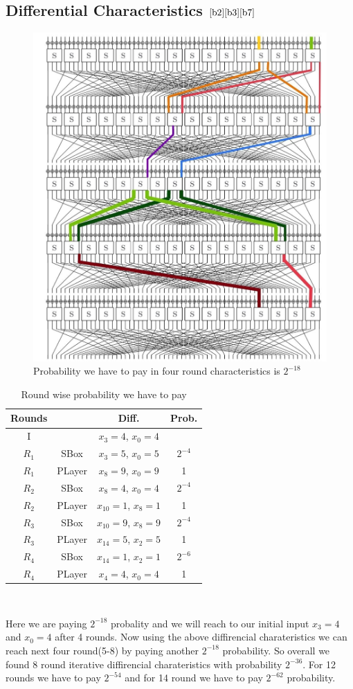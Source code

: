 \documentclass[journal=tosc,preprint]{iacrtrans}
\begin{document}
\subsection{Differential Characteristics $\cite{b2}\cite{b3}\cite{b7}$}
\begin{figure}[h!]
	\centering
	\includegraphics[width=0.6\linewidth, height=0.5\textheight]{IMG_20211114_110332}
	\caption{Probability we have to pay in four round characteristics is $2^{-18}$}
	\label{fig:img20211114110332}
\end{figure}
\newpage
\begin{table}[h!]
	\caption{Round wise probability we have to pay}
	\centering
	\begin{tabular}{ |c||c|c|c| }
		\hline
		Rounds & & Diff. & Prob. \\ \hline \hline
		I& & $x_3 = 4$, $x_0 = 4$ &  \\ 
		$R_1$& SBox & $x_3 = 5$, $x_{0} = 5$ & $2^{-4}$ \\
		$R_1$& PLayer & $x_8 = 9$, $x_{0} = 9$ & 1 \\
		$R_2$& SBox & $x_8 = 4$, $x_{0} = 4$ & $2^{-4}$ \\
		$R_2$& PLayer & $x_{10} = 1$, $x_{8} = 1$ & 1 \\
		$R_3$& SBox & $x_{10} = 9$, $x_{8} = 9$ & $2^{-4}$ \\
		$R_3$& PLayer & $x_{14} = 5$, $x_{2} = 5$ & 1 \\
		$R_4$& SBox & $x_{14} = 1$, $x_{2} = 1$  & $2^{-6}$ \\
		$R_4$& PLayer & $x_4 = 4$, $x_0 = 4$ & 1 \\ \hline
	\end{tabular}\\
\end{table}
Here we are paying $2^{-18}$ probality and we will reach to our initial input $x_3 = 4$ and $x_0 = 4$ after 4 rounds. Now using the above diffirencial charateristics we can reach next four round(5-8) by paying another $2^{-18}$ probability. So overall we found 8 round iterative diffirencial charateristics with probability $2^{-36}$. For 12 rounds we have to pay $2^{-54}$ and for 14 round we have to pay $2^{-62}$ probability.
\end{document}
